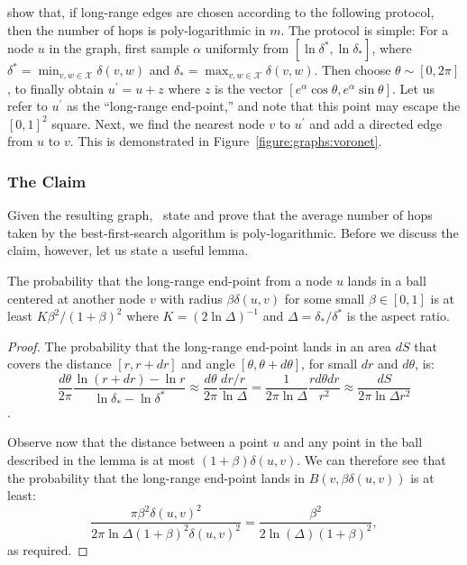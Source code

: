 \cite{voronet2007} show that, if long-range edges are chosen according to
the following protocol, then the number of hops is poly-logarithmic in $m$.
The protocol is simple: For a node $u$ in the graph,
first sample $\alpha$ uniformly from $[\ln \delta^\ast, \ln \delta_\ast]$,
where $\delta^\ast = \min_{v, w \in \mathcal{X}} \delta(v, w)$
and $\delta_\ast = \max_{v, w \in \mathcal{X}} \delta(v, w)$.
Then choose $\theta \sim [0, 2\pi]$, to finally obtain $u^\prime = u + z$
where $z$ is the vector $[e^\alpha \cos \theta, e^\alpha \sin \theta]$.
Let us refer to $u^\prime$ as the
``long-range end-point,'' and note that this point may escape
the $[0, 1]^2$ square. Next, we find the nearest node $v$ to $u^\prime$
and add a directed edge from $u$ to $v$.
This is demonstrated in Figure~\ref{figure:graphs:voronet}.

\subsubsection{The Claim}

Given the resulting graph,~\cite{voronet2007} state and prove that the
average number of hops taken by the best-first-search algorithm is poly-logarithmic.
Before we discuss the claim, however, let us state a useful lemma.

\begin{lemma}
    \label{lemma:graphs:voronet}
    The probability that the long-range end-point from a node $u$ lands in a ball
    centered at another node $v$ with radius $\beta \delta(u, v)$ for some small $\beta \in [0, 1]$
    is at least $K \beta^2 / (1 + \beta)^2$ where $K = (2 \ln \Delta)^{-1}$ and
    $\Delta = \delta_\ast / \delta^\ast$ is the aspect ratio.
\end{lemma}
\begin{proof}
    The probability that the long-range end-point lands in an area $dS$ that covers
    the distance $[r, r + dr]$ and angle $[\theta, \theta + d\theta]$, for small $dr$ and $d\theta$, is:
    \begin{equation*}
        \frac{d\theta}{2\pi} \frac{\ln (r + dr) - \ln r}{\ln \delta_\ast - \ln \delta^\ast} \approx
        \frac{d\theta}{2\pi} \frac{dr/r}{\ln \Delta} =
        \frac{1}{2\pi\ln \Delta} \frac{r d\theta dr}{r^2} \approx
        \frac{dS}{2 \pi \ln \Delta r^2}
    \end{equation*}.

    Observe now that the distance between a point $u$ and any point in the ball
    described in the lemma is at most $(1 + \beta) \delta(u, v)$. We can therefore
    see that the probability that the long-range end-point lands in $B(v, \beta \delta(u, v))$
    is at least:
    \begin{equation*}
        \frac{\pi \beta^2 \delta(u, v)^2}{2 \pi \ln \Delta (1 + \beta)^2 \delta(u, v)^2} =
        \frac{\beta^2}{2\ln(\Delta) (1 + \beta)^2},
    \end{equation*}
    as required.
\end{proof}

